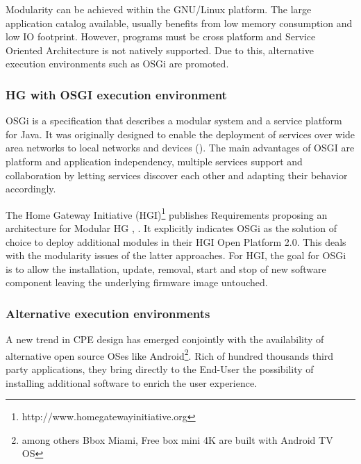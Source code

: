 Modularity can be achieved within the GNU/Linux platform.
The large application catalog available, usually benefits from low memory consumption and low IO footprint.
However, programs must be cross platform and Service Oriented Architecture is not natively supported.
Due to this, alternative execution environments such as OSGi are promoted.


   
\subsubsection{HG with OSGI execution environment}
   
OSGi is a specification that describes a modular system and a service platform for Java.
It was originally designed to enable the deployment of services over wide area networks to local networks and devices (\cite{marples_open_2001}).
The main advantages of OSGI are platform and application independency, multiple services support and collaboration by letting services discover each other and adapting their behavior accordingly.

The Home Gateway Initiative (HGI)\footnote{http://www.homegatewayinitiative.org} publishes Requirements  proposing an architecture for Modular HG \cite{_requirements_2011}, \cite{_hg_2014}.
It explicitly indicates OSGi as the solution of choice to deploy additional modules in their HGI Open Platform 2.0.
This deals with the modularity issues of the latter approaches.
For HGI, the goal for OSGi is to allow the installation, update, removal, start and stop of new software component leaving the underlying firmware image untouched.

\subsubsection{Alternative execution environments}

A new trend in CPE design has emerged conjointly with the availability of alternative open source OSes like Android\footnote{among others Bbox Miami, Free box mini 4K are built with Android TV OS}.
Rich of hundred thousands third party applications, they bring directly to the End-User the possibility of installing additional software to enrich the user experience.

